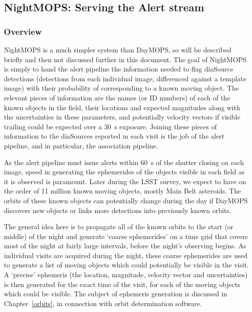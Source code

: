 \subsection{NightMOPS: Serving the Alert stream}

\subsubsection{Overview}

NightMOPS is a much simpler system than DayMOPS, so will be described
briefly and then not discussed further in this document. The goal of
NightMOPS is simply to hand the alert pipeline the information needed
to flag diaSource detections (detections from each individual image,
differenced against a template image) with their probability of
corresponding to a known moving object. The relevant pieces of
information are the names (or ID numbers) of each of the known objects
in the field, their locations and expected magnitudes along with the
uncertainties in these parameters, and potentially velocity vectors if
visible trailing could be expected over a 30~s exposure.  Joining
these pieces of information to the diaSources reported in each visit
is the job of the alert pipeline, and in particular, the association
pipeline. 

As the alert pipeline must issue alerts within 60~s of the shutter
closing on each image, speed in generating the ephemerides of the
objects visible in each field as it is observed is
paramount. Later during the LSST survey, we expect to have on the
order of 11 million known moving objects, mostly Main Belt
asteroids. The orbits of these known objects can potentially 
change during the day if DayMOPS discovers new objects or links more
detections into previously known orbits. 

The general idea here is to propagate all of the known orbits to the
start (or middle) of the night and generate `coarse ephemerides' on a
time grid that covers most of the night at fairly large intervals,
before the night's observing begins. As
individual visits are acquired during the night, these coarse
ephemerides are used to generate a list of moving objects which could
potentially be visible in the visit. A `precise' ephemeris (the
location, magnitude, velocity vector and uncertainties) is then
generated for the exact time of the visit, for each of the moving objects
which could be visible. The subject of ephemeris generation is
discussed in Chapter~\ref{orbits}, in connection with orbit
determination software.

